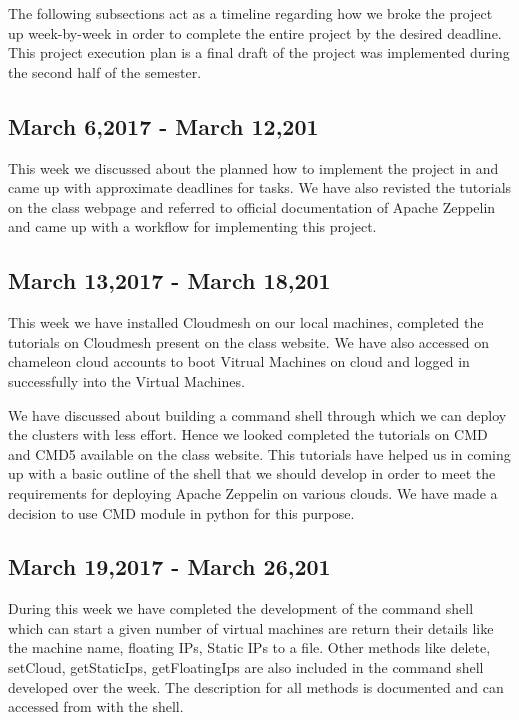 \documentclass[9pt,twocolumn,twoside]{../../styles/osajnl}
\begin{document}
The following subsections act as a timeline regarding how we broke 
the project up week-by-week in order to complete the entire project 
by the desired deadline. This project execution plan is a final draft 
of the project was implemented during the second half of the semester.

\subsection{March 6,2017 - March 12,201}

This week we discussed about the planned how to implement the project 
in and came up with approximate deadlines for tasks. We have also 
revisted the tutorials on the class webpage and referred to official 
documentation of Apache Zeppelin and came up with a workflow for 
implementing this project.

\subsection{March 13,2017 - March 18,201}

This week we have installed Cloudmesh on our local machines, 
completed the tutorials on Cloudmesh present on the class website. We 
have also accessed on chameleon cloud accounts to boot Vitrual 
Machines on cloud and logged in successfully into the Virtual 
Machines.

We have discussed about building a command shell through which 
we can deploy the clusters with less effort. Hence we looked 
completed the tutorials on CMD and CMD5 available on the class 
website. This tutorials have helped us in coming up with a basic 
outline of the shell that we should develop in order to meet the 
requirements for deploying Apache Zeppelin on various clouds. We have 
made a decision to use CMD module in python for this purpose.
 
\subsection{March 19,2017 - March 26,201}

During this week we have completed the development of the command 
shell which can start a given number of virtual machines are return 
their details like the machine name, floating IPs, Static IPs to a 
file. Other methods like delete, setCloud, getStaticIps, 
getFloatingIps are also included in the command shell developed over 
the week.  The description for all methods is documented and can 
accessed from with the shell.
\end{document}
